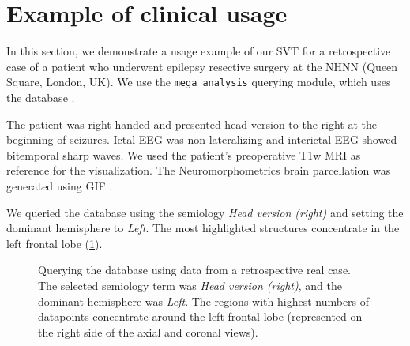 \section{Example of clinical usage}


In this section, we demonstrate a usage example of our \ac{SVT} for a retrospective case of a patient who underwent epilepsy resective surgery at the \ac{NHNN} (Queen Square, London, UK).
We use the \texttt{mega\_analysis} querying module, which uses the \svtdatabase database \cite{alim-marvasti_mapping_2021,alim-marvasti_probabilistic_2021}.

The patient was right-handed and presented head version to the right at the beginning of seizures.
Ictal \ac{EEG} was non lateralizing and interictal \ac{EEG} showed bitemporal sharp waves.
We used the patient's preoperative \ac{T1w} \ac{MRI} as reference for the visualization.
The Neuromorphometrics brain parcellation was generated using \ac{GIF} \cite{cardoso_geodesic_2015}.

We queried the database using the semiology \textit{Head version (right)} and setting the dominant hemisphere to \textit{Left}.
The most highlighted structures concentrate in the left frontal lobe (\cref{fig:svt_case_heatmap}).

\begin{figure}[!ht]
  \centering
  \caption[Querying the database using a retrospective real case]{
    Querying the database using data from a retrospective real case.
    The selected semiology term was \textit{Head version (right)}, and the dominant hemisphere was \textit{Left}.
    The regions with highest numbers of datapoints concentrate around the left frontal lobe (represented on the right side of the axial and coronal views).
  }
  \label{fig:svt_case_heatmap}
\end{figure}

